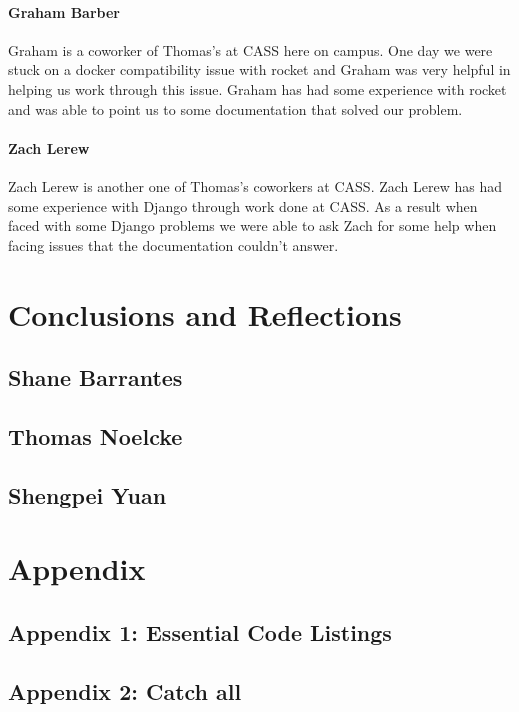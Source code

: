 \documentclass[onecolumn, draftclsnofoot,10pt, compsoc]{article}
\begin{document}
            \paragraph{Graham Barber} Graham is a coworker of Thomas's at CASS here on campus. One day we were stuck on a docker compatibility issue with rocket and Graham was very helpful in helping us work through this issue. Graham has had some experience with rocket and was able to point us to some documentation that solved our problem.
            
            \paragraph{Zach Lerew} Zach Lerew is another one of Thomas's coworkers at CASS. Zach Lerew has had some experience with Django through work done at CASS. As a result when faced with some Django problems we were able to ask Zach for some help when facing issues that the documentation couldn't answer.\\
    

\section{Conclusions and Reflections}
    \subsection{Shane Barrantes}
    
    \subsection{Thomas Noelcke}
    
    \subsection{Shengpei Yuan}

\section{Appendix}    

    \subsection{Appendix 1: Essential Code Listings}

    \subsection{Appendix 2: Catch all}
\end{document}

